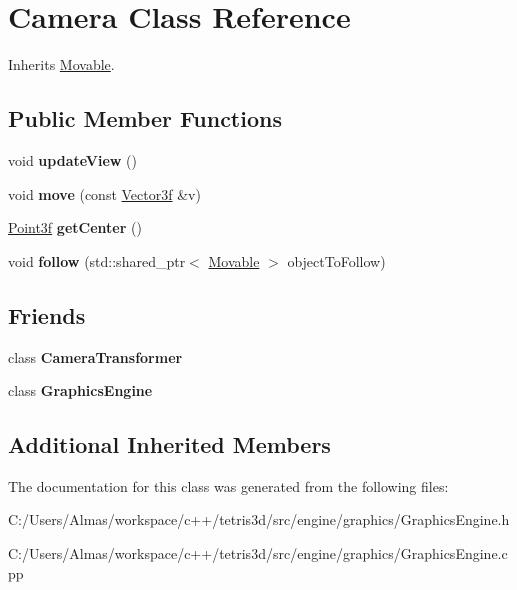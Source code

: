 \hypertarget{class_camera}{\section{Camera Class Reference}
\label{class_camera}
}


Inherits \hyperlink{class_movable}{Movable}.

\subsection*{Public Member Functions}
\begin{DoxyCompactItemize}
\item 
\hypertarget{class_camera_a84fd8b7dc4e2f00fb0bb43c462bfc71d}{void {\bfseries update\-View} ()}\label{class_camera_a84fd8b7dc4e2f00fb0bb43c462bfc71d}

\item 
\hypertarget{class_camera_a99f4873eb941aea334a4da496a0258d1}{void {\bfseries move} (const \hyperlink{struct_vector3f}{Vector3f} \&v)}\label{class_camera_a99f4873eb941aea334a4da496a0258d1}

\item 
\hypertarget{class_camera_a1935560472025ddfb77c93e79218ee10}{\hyperlink{struct_point3f}{Point3f} {\bfseries get\-Center} ()}\label{class_camera_a1935560472025ddfb77c93e79218ee10}

\item 
\hypertarget{class_camera_a0b50fc952f907edb497944ed05232339}{void {\bfseries follow} (std\-::shared\-\_\-ptr$<$ \hyperlink{class_movable}{Movable} $>$ object\-To\-Follow)}\label{class_camera_a0b50fc952f907edb497944ed05232339}

\end{DoxyCompactItemize}
\subsection*{Friends}
\begin{DoxyCompactItemize}
\item 
\hypertarget{class_camera_afc0ffea856d577744749506f55994b9e}{class {\bfseries Camera\-Transformer}}\label{class_camera_afc0ffea856d577744749506f55994b9e}

\item 
\hypertarget{class_camera_a087f33ae84cd797391769efdc5c012d7}{class {\bfseries Graphics\-Engine}}\label{class_camera_a087f33ae84cd797391769efdc5c012d7}

\end{DoxyCompactItemize}
\subsection*{Additional Inherited Members}


The documentation for this class was generated from the following files\-:\begin{DoxyCompactItemize}
\item 
C\-:/\-Users/\-Almas/workspace/c++/tetris3d/src/engine/graphics/Graphics\-Engine.\-h\item 
C\-:/\-Users/\-Almas/workspace/c++/tetris3d/src/engine/graphics/Graphics\-Engine.\-cpp\end{DoxyCompactItemize}
